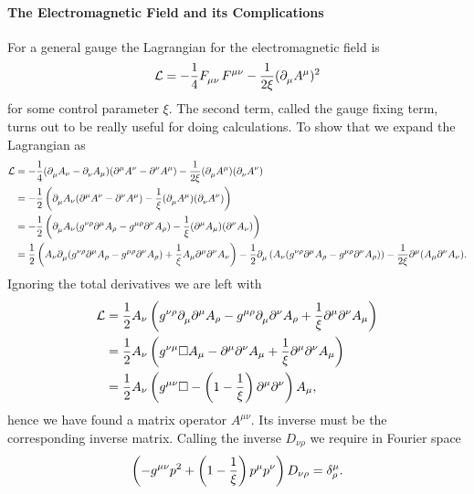\paragraph{The Electromagnetic Field and its Complications}
For a general gauge the Lagrangian for the electromagnetic field is
\begin{align*}
	\lag = -\frac{1}{4}\tensor{F}{_{\mu\nu}}\tensor{F}{^{\mu\nu}} - \frac{1}{2\xi}(\del{}{\mu}A^{\mu})^{2}
\end{align*}
for some control parameter $\xi$. The second term, called the gauge fixing term, turns out to be really useful for doing calculations. To show that we expand the Lagrangian as
\begin{align*}
	\mathcal{L} &= -\frac{1}{4}(\partial^{}_{\mu}A_{\nu} - \partial^{}_{\nu}A_{\mu})(\partial^{\mu}_{}A^{\nu} - \partial^{\nu}_{}A^{\mu}) - \frac{1}{2\xi}(\partial^{}_{\mu}A^{\mu})(\partial^{}_{\nu}A^{\nu}) \\
	     &= -\frac{1}{2}\left(\partial^{}_{\mu}A_{\nu}(\partial^{\mu}_{}A^{\nu} - \partial^{\nu}_{}A^{\mu}) - \frac{1}{\xi}(\partial^{}_{\mu}A^{\mu})(\partial^{}_{\nu}A^{\nu})\right) \\
	     &= -\frac{1}{2}\left(\partial^{}_{\mu}A_{\nu}(g^{\nu\rho}\partial^{\mu}_{}A_{\rho} - g^{\mu\rho}\partial^{\nu}_{}A_{\rho}) - \frac{1}{\xi}(\partial^{\mu}_{}A_{\mu})(\partial^{\nu}_{}A_{\nu})\right) \\
	     &= \frac{1}{2}\left(A_{\nu}\partial^{}_{\mu}(g^{\nu\rho}\partial^{\mu}_{}A_{\rho} - g^{\mu\rho}\partial^{\nu}_{}A_{\rho}) + \frac{1}{\xi}A_{\mu}\partial^{\mu}_{}\partial^{\nu}_{}A_{\nu}\right) - \frac{1}{2}\partial^{}_{\mu}\left(A_{\nu}(g^{\nu\rho}\partial^{\mu}_{}A_{\rho} - g^{\mu\rho}\partial^{\nu}_{}A_{\rho})\right) - \frac{1}{2\xi}\partial^{\mu}_{}(A_{\mu}\partial^{\nu}_{}A_{\nu}).
\end{align*}
Ignoring the total derivatives we are left with
\begin{align*}
	\mathcal{L} &= \frac{1}{2}A_{\nu}\left(g^{\nu\rho}\partial^{}_{\mu}\partial^{\mu}_{}A_{\rho} - g^{\mu\rho}\partial^{}_{\mu}\partial^{\nu}_{}A_{\rho} + \frac{1}{\xi}\partial^{\mu}_{}\partial^{\nu}_{}A_{\mu}\right) \\
	     &= \frac{1}{2}A_{\nu}\left(g^{\nu\mu}\square A_{\mu} - \partial^{\mu}_{}\partial^{\nu}_{}A_{\mu} + \frac{1}{\xi}\partial^{\mu}_{}\partial^{\nu}_{}A_{\mu}\right) \\
	     &= \frac{1}{2}A_{\nu}\left(g^{\mu\nu}\square - \left(1 - \frac{1}{\xi}\right)\partial^{\mu}_{}\partial^{\nu}_{}\right)A_{\mu},
\end{align*}
hence we have found a matrix operator $A^{\mu\nu}$. Its inverse must be the corresponding inverse matrix. Calling the inverse $D_{\nu\rho}$ we require in Fourier space
\begin{align*}
	\left(-g^{\mu\nu}p^{2} + \left(1 - \frac{1}{\xi}\right)p^{\mu}p^{\nu}\right)D_{\nu\rho} = \kdelta{\mu}{\rho}.
\end{align*}
